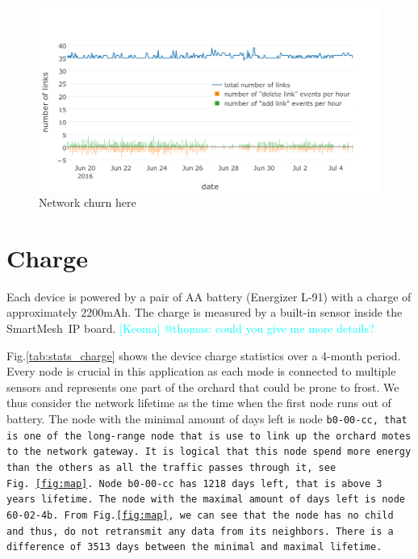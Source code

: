 \documentclass{sig-alternate}
\newcommand{\keoma}[1]              {\textcolor{cyan}{[Keoma] #1}}
\newcommand{\smip}                  {SmartMesh~IP\xspace}
\begin{document}
\begin{figure}
    \centering
    \includegraphics[width=\columnwidth]{net_churn}
    \caption{Network churn here}
    \label{fig:net_churn}
\end{figure}

\section{Charge}
\label{sec:charge}


Each device is powered by a pair of AA battery (Energizer L-91) with a charge of approximately 2200mAh.
The charge is measured by a built-in sensor inside the \smip board. \keoma{@thomas: could you give me more details?}


Fig.\ref{tab:stats_charge} shows the device charge statistics over a 4-month period.
Every node is crucial in this application as each mode is connected to multiple sensors and represents one part of the orchard that could be prone to frost.
We thus consider the network lifetime as the time when the first node runs out of battery.
The node with the minimal amount of days left is node \tt{b0-00-cc}, that is one of the long-range node that is use to link up the orchard motes to the network gateway.
It is logical that this node spend more energy than the others as all the traffic passes through it, see Fig.~\ref{fig:map}.
Node \tt{b0-00-cc} has 1218 days left, that is above 3 years lifetime.
The node with the maximal amount of days left is node \tt{60-02-4b}.
From~Fig.\ref{fig:map}, we can see that the node has no child and thus, do not retransmit any data from its neighbors.
There is a difference of 3513 days between the minimal and maximal lifetime.
\end{document}
